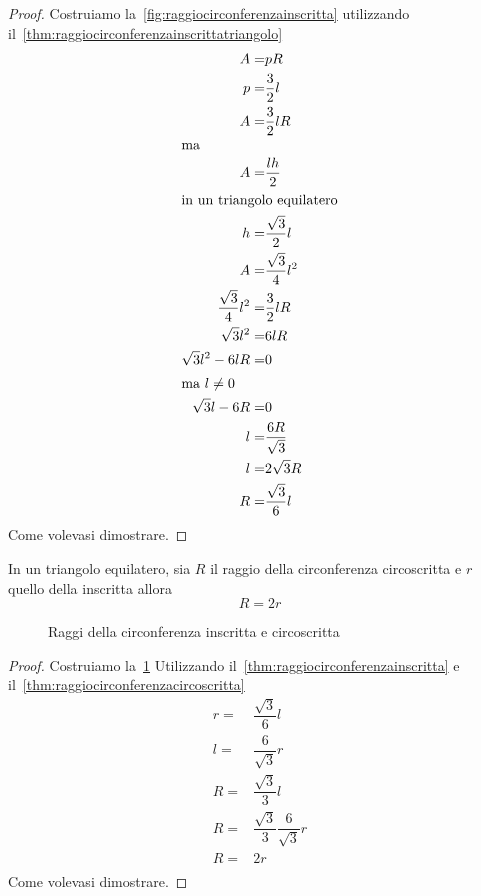 \begin{proof}
Costruiamo la~\cref{fig:raggiocirconferenzainscritta}	
utilizzando il~\cref{thm:raggiocirconferenzainscrittatriangolo}
\begin{align*}
	A=&pR\\
	p=&\frac{3}{2}l\\
	A=&\frac{3}{2}lR\\
	\intertext{ma}
	A=&\frac{lh}{2}\\
	\intertext{in un triangolo equilatero}
	h=&\frac{\sqrt{3}}{2}l\\
	A=&\frac{\sqrt{3}}{4}l^2\\
	\frac{\sqrt{3}}{4}l^2=&\frac{3}{2}lR\\
	\sqrt{3}l^2=&6lR\\
	\sqrt{3}l^2-6lR=&0\\
	\intertext{ma $l\neq0$}
	\sqrt{3}l-6R=&0\\
	l=&\dfrac{6R}{\sqrt{3}}\\
	l=&2\sqrt{3}R\\
	R=&\dfrac{\sqrt{3}}{6}l
\end{align*}
Come volevasi dimostrare.
\end{proof}
\begin{cor}\label{thm:raggicirconferenzeinscrittacircoscritta}
	In un triangolo equilatero, sia $R$ il raggio della circonferenza circoscritta e $r$ quello della inscritta allora\[R=2r\]  
\end{cor}
\begin{figure}
	\centering
	
	\caption{Raggi della circonferenza inscritta e circoscritta}
	\label{fig:raggicirconferenzainscrittacircoscritta}
\end{figure}
\begin{proof}
Costruiamo la~\cref{fig:raggicirconferenzainscrittacircoscritta} Utilizzando il~\cref{thm:raggiocirconferenzainscritta} e il~\cref{thm:raggiocirconferenzacircoscritta}
\begin{align*}
	r=&\dfrac{\sqrt{3}}{6}l\\
	l=&\dfrac{6}{\sqrt{3}}r\\
	R=&\dfrac{\sqrt{3}}{3}l\\
	R=&\dfrac{\sqrt{3}}{3}\dfrac{6}{\sqrt{3}}r\\
	R=&2r\\
\end{align*}
Come volevasi dimostrare.
\end{proof}
